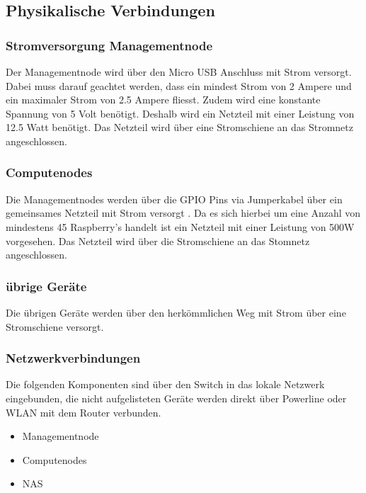\subsection{Physikalische Verbindungen}

\subsubsection{Stromversorgung Managementnode}
Der Managementnode wird über den Micro USB Anschluss mit Strom versorgt. Dabei muss darauf geachtet werden, dass ein mindest Strom von 2 Ampere und ein maximaler Strom von 2.5 Ampere fliesst. Zudem wird eine konstante Spannung von 5 Volt benötigt. Deshalb wird ein Netzteil mit einer Leistung von 12.5 Watt benötigt. Das Netzteil wird über eine Stromschiene an das Stromnetz angeschlossen.

\subsubsection{Computenodes}
Die Managementnodes werden über die GPIO Pins via Jumperkabel über ein gemeinsames Netzteil mit Strom versorgt . Da es sich hierbei um eine Anzahl von mindestens 45 Raspberry's handelt ist ein Netzteil mit einer Leistung von 500W vorgesehen. Das Netzteil wird über die Stromschiene an das Stomnetz angeschlossen.


\subsubsection{übrige Geräte}
Die übrigen Geräte werden über den herkömmlichen Weg mit Strom über eine Stromschiene versorgt.

\subsubsection{Netzwerkverbindungen}
Die folgenden Komponenten sind über den Switch in das lokale Netzwerk eingebunden, die nicht aufgelisteten Geräte werden direkt über Powerline oder WLAN mit dem Router verbunden.
\begin{itemize}
\item Managementnode
\item Computenodes
\item NAS
\end{itemize}


